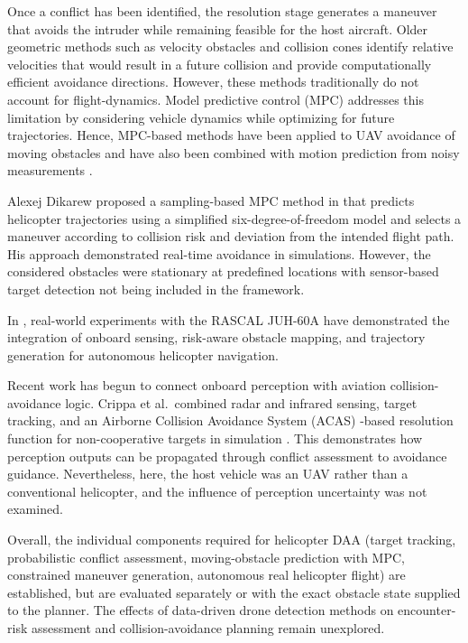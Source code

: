 Once a conflict has been identified, the resolution stage generates a maneuver that avoids the intruder while remaining feasible for the host aircraft. Older geometric methods such as velocity obstacles \cite{fiorini1998velocityObstacles} and collision cones \cite{chakravarthy1998collisionCone} identify relative velocities that would result in a future collision and provide computationally efficient avoidance directions. However, these methods traditionally do not account for flight-dynamics. Model predictive control (MPC) addresses this limitation by considering vehicle dynamics while optimizing for future trajectories. Hence, MPC-based methods have been applied to UAV avoidance of moving obstacles and have also been combined with motion prediction from noisy measurements \cite{lindqvist2020dynamicObstacleMPC,olcay2024dynamicObstacleForecast}.

Alexej Dikarew proposed a sampling-based MPC method in \cite{dikarew2024helicopterMPCA} that predicts helicopter trajectories using a simplified six-degree-of-freedom model and selects a maneuver according to collision risk and deviation from the intended flight path. His approach demonstrated real-time avoidance in simulations. However, the  considered obstacles were stationary at predefined locations with sensor-based target detection not being included in the framework.

In \cite{whalley2014autonomousBlackHawk}, real-world experiments with the RASCAL JUH-60A have demonstrated the integration of onboard sensing, risk-aware obstacle mapping, and trajectory generation for autonomous helicopter navigation. 

Recent work has begun to connect onboard perception with aviation collision-avoidance logic. Crippa et al.\ combined radar and infrared sensing, target tracking, and an Airborne Collision Avoidance System (ACAS) -based resolution function for non-cooperative targets in simulation \cite{crippa2025acasNonCooperative}. This demonstrates how perception outputs can be propagated through conflict assessment to avoidance guidance. Nevertheless, here, the host vehicle was an UAV rather than a conventional helicopter, and the influence of perception uncertainty was not examined.

Overall, the individual components required for helicopter DAA (target tracking, probabilistic conflict assessment, moving-obstacle prediction with MPC, constrained maneuver generation, autonomous real helicopter flight) are established, but are evaluated separately or with the exact obstacle state supplied to the planner. The effects of data-driven drone detection methods on encounter-risk assessment and collision-avoidance planning remain unexplored.
\pagebreak

